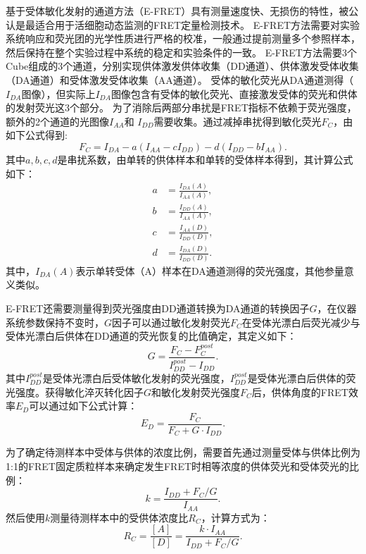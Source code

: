 \ifshowtext
基于受体敏化发射的通道方法（E-FRET）具有测量速度快、无损伤的特性，被公认是最适合用于活细胞动态监测的FRET定量检测技术。
E-FRET方法需要对实验系统响应和荧光团的光学性质进行严格的校准，一般通过提前测量多个参照样本，然后保持在整个实验过程中系统的稳定和实验条件的一致。
E-FRET方法需要3个Cube组成的3个通道，分别实现供体激发供体收集（DD通道）、供体激发受体收集（DA通道）和受体激发受体收集（AA通道）。
受体的敏化荧光从DA通道测得（$I_{DA}$图像），但实际上$I_{DA}$图像包含有受体的敏化荧光、直接激发受体的荧光和供体的发射荧光这3个部分。
为了消除后两部分串扰是FRET指标不依赖于荧光强度，额外的2个通道的光图像$I_{AA}$和 $I_{DD}$需要收集。通过减掉串扰得到敏化荧光$F_C$，由如下公式得到:
\begin{equation}
F_C=I_{DA}-a(I_{AA}-cI_{DD})-d(I_{DD}-bI_{AA}).
\label{eq:fc}
\end{equation}
其中$a, b, c, d$是串扰系数，由单转的供体样本和单转的受体样本得到，其计算公式如下：
\begin{align}
a&=\frac{I_{DA}(A)}{I_{AA}(A)}, \label{eq:a}\\
b&=\frac{I_{DD}(A)}{I_{AA}(A)}, \label{eq:b}\\ 
c&=\frac{I_{AA}(D)}{I_{DD}(D)}, \label{eq:c}\\ 
d&=\frac{I_{DA}(D)}{I_{DD}(D)}. \label{eq:d}
\end{align}
其中，$I_{DA}(A)$表示单转受体（A）样本在DA通道测得的荧光强度，其他参量意义类似。

E-FRET还需要测量得到荧光强度由DD通道转换为DA通道的转换因子$G$，在仪器系统参数保持不变时，$G$因子可以通过敏化发射荧光$F_C$在受体光漂白后荧光减少与受体光漂白后供体在DD通道的荧光恢复的比值确定，其定义如下：
\begin{equation}
    G=\frac{F_C-F_C^{post}}{I_{DD}^{post}-I_{DD}}.
    \label{eq:g}
\end{equation}
其中$I_{DD}^{post}$是受体光漂白后受体敏化发射的荧光强度，$I_{DD}^{post}$是受体光漂白后供体的荧光强度。获得敏化淬灭转化因子$G$和敏化发射荧光强度$F_C$后，供体角度的FRET效率$E_D$可以通过如下公式计算：
\begin{equation}
    E_D=\frac{F_C}{F_C+G \cdot I_{DD}}.
    \label{eq:ed}
\end{equation}

为了确定待测样本中受体与供体的浓度比例，需要首先通过测量受体与供体比例为1:1的FRET固定质粒样本来确定发生FRET时相等浓度的供体荧光和受体荧光的比例：
\begin{equation}
    k=\frac{I_{DD}+F_C/G}{I_{AA}}.
    \label{eq:k}
\end{equation}
然后使用$k$测量待测样本中的受供体浓度比$R_C$，计算方式为：
\begin{equation}
    R_C = \frac{[A]}{[D]} = \frac{k \cdot I_{AA}}{I_{DD} + F_C/G}.
    \label{eq:rc}
\end{equation}
\fi


